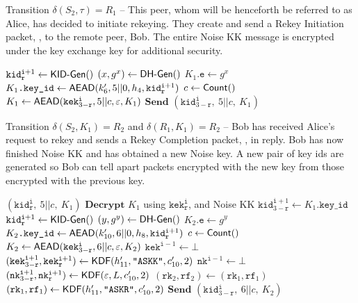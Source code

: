 \documentclass{article}
\begin{document}
\begin{algorithm}
	\caption{Transition $\delta(S_2, \tau)=R_1$ -- This peer, whom will be henceforth be referred to as Alice, has decided to initiate rekeying. They create and send a Rekey Initiation packet, , to the remote peer, Bob. The entire Noise KK message is encrypted under the key exchange key for additional security.}
	\begin{algorithmic}
		\State $\texttt{kid}^{\texttt{i} + 1}_\texttt{r} \gets \text{\sf KID-Gen}()$
		\State $(x, g^x) \gets \text{\sf DH-Gen}()$
		\State $K_1\texttt{.e} \gets g^x$
		\State $K_1\texttt{.key\_id} \gets \text{\sf AEAD}(k_{6}', 5||0, h_{4}, \texttt{kid}^{\texttt{i} + 1}_\texttt{r})$
		\State $c \gets \text{\sf Count}()$
		\State $K_1 \gets \text{\sf AEAD}(\texttt{kek}^\texttt{i}_{3 - \texttt{r}}, 5||c, \varepsilon, K_1)$
		\State $\textbf{Send } (\texttt{kid}^\texttt{i}_{3 - \texttt{r}},\ 5||c,\ K_1)$
	\end{algorithmic}
\end{algorithm}


\begin{algorithm}
	\caption{Transition $\delta(S_2, K_1)=R_2$ and $\delta(R_1, K_1)=R_2$ -- Bob has received Alice's request to rekey and sends a Rekey Completion packet, , in reply. Bob has now finished Noise KK and has obtained a new Noise key. A new pair of key ids are generated so Bob can tell apart packets encrypted with the new key from those encrypted with the previous key.}
	\begin{algorithmic}
		\Require $(\texttt{kid}^\texttt{i}_\texttt{r},\ 5||c,\ K_1)$
		\State $\textbf{Decrypt } K_1$ using $\texttt{kek}^\texttt{i}_\texttt{r}$, and Noise KK
		\State $\texttt{kid}^{\texttt{i} + 1}_{3 - \texttt{r}} \gets K_1\texttt{.key\_id}$
		\State $\texttt{kid}^{\texttt{i} + 1}_\texttt{r} \gets \text{\sf KID-Gen}()$
		\State $(y, g^y) \gets \text{\sf DH-Gen}()$
		\State $K_2\texttt{.e} \gets g^y$
		\State $K_2\texttt{.key\_id} \gets \text{\sf AEAD}(k_{10}', 6||0, h_{8}, \texttt{kid}^{\texttt{i} + 1}_\texttt{r})$
		\State $c \gets \text{\sf Count}()$
		\State $K_2 \gets \text{\sf AEAD}(\texttt{kek}^\texttt{i}_{3 - \texttt{r}}, 6||c, \varepsilon, K_2)$
		\State $\texttt{kek}^{\texttt{i} - 1} \gets \bot$
		\State $(\texttt{kek}^{\texttt{i} + 1}_{3 - \texttt{r}}, \texttt{kek}^{\texttt{i} + 1}_\texttt{r}) \gets \text{\sf KDF}(h_{11}', \texttt{"ASKK"}, c_{10}', 2)$
		\State $\texttt{nk}^{\texttt{i} - 1} \gets \bot$
		\State $(\texttt{nk}^{\texttt{i} + 1}_{3 - \texttt{r}}, \texttt{nk}^{\texttt{i} + 1}_\texttt{r}) \gets \text{\sf KDF}(\varepsilon, L, c_{10}', 2)$
		\State $(\texttt{rk}_2, \texttt{rf}_2) \gets (\texttt{rk}_1, \texttt{rf}_1)$
		\State $(\texttt{rk}_1, \texttt{rf}_1) \gets \text{\sf KDF}(h_{11}', \texttt{"ASKR"}, c_{10}', 2)$
		\State $\textbf{Send } (\texttt{kid}^\texttt{i}_{3 - \texttt{r}},\ 6||c,\ K_2)$
	\end{algorithmic}
\end{algorithm}
\end{document}
